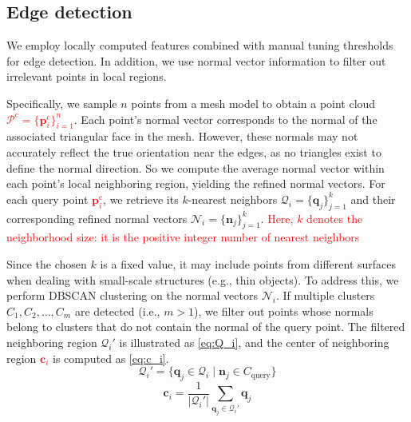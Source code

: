 \documentclass[journal]{IEEEtran}
\newcommand{\rev}[1]{\textcolor{red}{#1}}
\begin{document}
\subsection{Edge detection}
We employ locally computed features combined with manual tuning thresholds for edge detection. In addition, we use normal vector information to filter out irrelevant points in local regions.

Specifically, we sample \( n \) points from a mesh model to obtain a point cloud \rev{$\mathcal{P}^\text{c}=\{\mathbf{p}_i^\text{c}\}_{i=1}^n$}. Each point's normal vector corresponds to the normal of the associated triangular face in the mesh. However, these normals may not accurately reflect the true orientation near the edges, as no triangles exist to define the normal direction. So we compute the average normal vector within each point's local neighboring region, yielding the refined normal vectors. 
For each query point \rev{$\mathbf{p}_i^\text{c}$}, we retrieve its \( k \)-nearest neighbors \( \mathcal{Q}_i = \{\mathbf{q}_j\}_{j=1}^k \) and their corresponding refined normal vectors \( \mathcal{N}_i = \{\mathbf{n}_j\}_{j=1}^k \).
\rev{Here, $k$ denotes the neighborhood size: it is the positive integer number of nearest neighbors}

Since the chosen $k$ is a fixed value, it may include points from different surfaces when dealing with small-scale structures (e.g., thin objects). To address this, we perform DBSCAN clustering on the normal vectors \( \mathcal{N}_i \). If multiple clusters \( C_1, C_2, \dots, C_m \) are detected (i.e., \( m > 1 \)), we filter out points whose normals belong to clusters that do not contain the normal of the query point. The filtered neighboring region \(\mathcal{Q}_i' \) is illustrated as \cref{eq:Q_i}, and the center of neighboring region \rev{\( \mathbf{c}_i \)} is computed as \cref{eq:c_i}.
\begin{equation}
   \mathcal{Q}_i' = \{\mathbf{q}_j \in\mathcal{Q}_i \mid \mathbf{n}_j \in C_{\text{query}} \}
   \label{eq:Q_i}
\end{equation}
\begin{equation}
    \mathbf{c}_i = \frac{1}{|\mathcal{Q}_i'|} \sum_{\mathbf{q}_j \in\mathcal{Q}_i'} \mathbf{q}_j
    \label{eq:c_i}
\end{equation}
\end{document}
